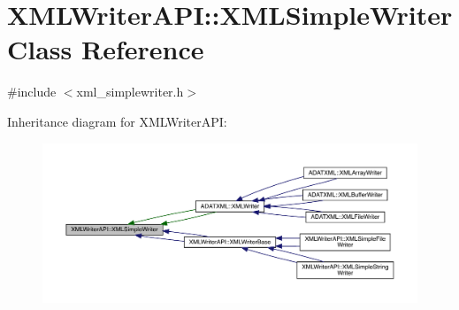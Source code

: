 \hypertarget{classXMLWriterAPI_1_1XMLSimpleWriter}{}\section{X\+M\+L\+Writer\+A\+PI\+:\+:X\+M\+L\+Simple\+Writer Class Reference}
\label{classXMLWriterAPI_1_1XMLSimpleWriter}


{\ttfamily \#include $<$xml\+\_\+simplewriter.\+h$>$}



Inheritance diagram for X\+M\+L\+Writer\+A\+PI\+:\nopagebreak
\begin{figure}[H]
\begin{center}
\leavevmode
\includegraphics[width=350pt]{d8/de4/classXMLWriterAPI_1_1XMLSimpleWriter__inherit__graph}
\end{center}
\end{figure}
